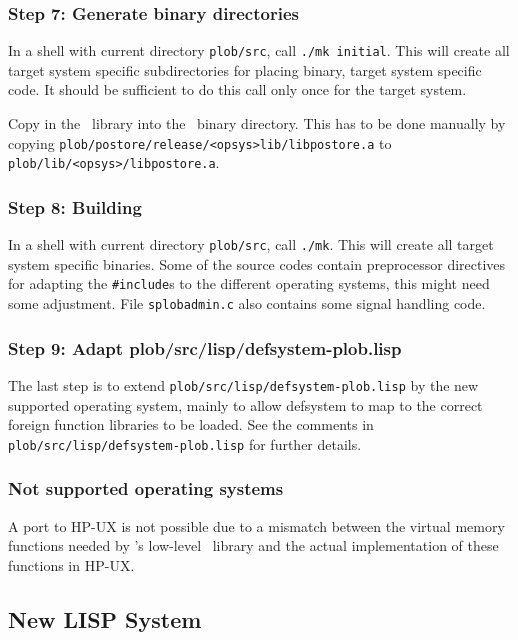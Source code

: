 \subsubsection{Step 7: Generate binary directories}

In a shell with current directory \texttt{plob/src}, call \texttt{./mk
  initial}. This will create all target system specific subdirectories
for placing binary, target system specific code. It should be
sufficient to do this call only once for the target system.

Copy in the \postore\ library into the \plob\ binary directory.  This
has to be done manually by copying
\texttt{plob/postore/release/<opsys>lib/libpostore.a} to
\texttt{plob/lib/<opsys>/libpostore.a}.

\subsubsection{Step 8: Building \protect\plob}

In a shell with current directory \texttt{plob/src}, call
\texttt{./mk}.  This will create all target system specific binaries.
Some of the source codes contain preprocessor directives for adapting
the \texttt{\#include}s to the different operating systems, this might
need some adjustment. File \texttt{splobadmin.c} also contains some
signal handling code.

\subsubsection{Step 9: Adapt plob/src/lisp/defsystem-plob.lisp}

The last step is to extend \texttt{plob/src/lisp/defsystem-plob.lisp}
by the new supported operating system, mainly to allow defsystem to
map to the correct foreign function libraries to be loaded. See the
comments in \texttt{plob/src/lisp/defsystem-plob.lisp} for further
details.

\subsubsection{Not supported operating systems}

A port to HP-UX is not possible due to a mismatch between the virtual
memory functions needed by \plob's low-level \postore\ library and the
actual implementation of these functions in HP-UX.

\subsection{New LISP System}

